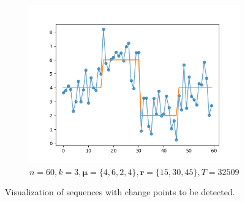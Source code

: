 \begin{figure}[H]
\begin{subfigure}{.3\textwidth}
    	\includegraphics[width=\linewidth]{../../plots/sequence_M4_N60_seed3_diffind2.png}
    	\caption{$n=60, k=3, \bm{\mu} = \{4, 6, 2,4\}, \bm{r} = \{15, 30, 45\}, T = 32509$}
	\end{subfigure}
	\label{fig:sequences_viz}
	\caption{Visualization of sequences with change points to be detected.}
\end{figure}

